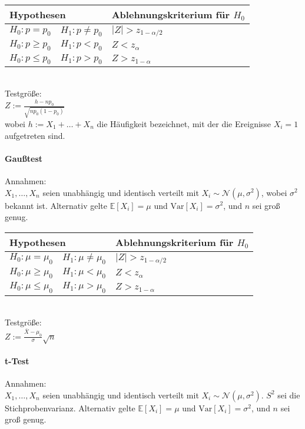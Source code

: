 \documentclass[a4paper,9pt]{extarticle}
\newcommand{\Var}{\text{Var}}
\begin{document}
\begin{tabular}{l @{ gegen } l|l}
	\multicolumn{2}{l}{Hypothesen} & Ablehnungskriterium für $H_0$\\
	\hline
	$H_0 : p = p_0$ & $H_1 : p ≠ p_0$ & $|Z| > z_{1-\alpha/2}$ \\
	$H_0 : p ≥ p_0$ & $H_1 : p < p_0$ & $Z < z_{\alpha}$ \\
	$H_0 : p ≤ p_0$ & $H_1 : p > p_0$ & $Z > z_{1 - \alpha}$ \\
\end{tabular} \\

Testgröße: \\
$Z := \frac{h - np_0}{\sqrt{np_0(1-p_0)}}$ \\
wobei $h := X_1 + \dots + X_n$ die Häufigkeit bezeichnet, mit der die Ereignisse $X_i = 1$ aufgetreten sind.

\paragraph*{Gaußtest}
Annahmen: \\
$X_1, \dots, X_n$ seien unabhängig und identisch verteilt mit $X_i \sim \mathcal{N}(\mu, \sigma^2)$, wobei $\sigma^2$ bekannt ist. Alternativ gelte $\mathbb{E}[X_i] = \mu$ und $\Var[X_i] = \sigma^2$, und $n$ sei groß genug. \\

\begin{tabular}{l @{ gegen } l|l}
	\multicolumn{2}{l}{Hypothesen} & Ablehnungskriterium für $H_0$\\
	\hline
	$H_0 : \mu = \mu_0$ & $H_1 : \mu ≠ \mu_0$ & $|Z| > z_{1-\alpha/2}$ \\
	$H_0 : \mu ≥ \mu_0$ & $H_1 : \mu < \mu_0$ & $Z < z_{\alpha}$ \\
	$H_0 : \mu ≤ \mu_0$ & $H_1 : \mu > \mu_0$ & $Z > z_{1 - \alpha}$ \\
\end{tabular} \\

Testgröße: \\
$Z := \frac{\bar{X} - \mu_0}{\sigma}\sqrt{n}$

\paragraph*{t-Test}
Annahmen: \\
$X_1, \dots, X_n$ seien unabhängig und identisch verteilt mit $X_i \sim \mathcal{N}(\mu, \sigma^2)$. $S^2$ sei die Stichprobenvarianz. Alternativ gelte $\mathbb{E}[X_i] = \mu$ und $\Var[X_i] = \sigma^2$, und $n$ sei groß genug. \\
\end{document}
